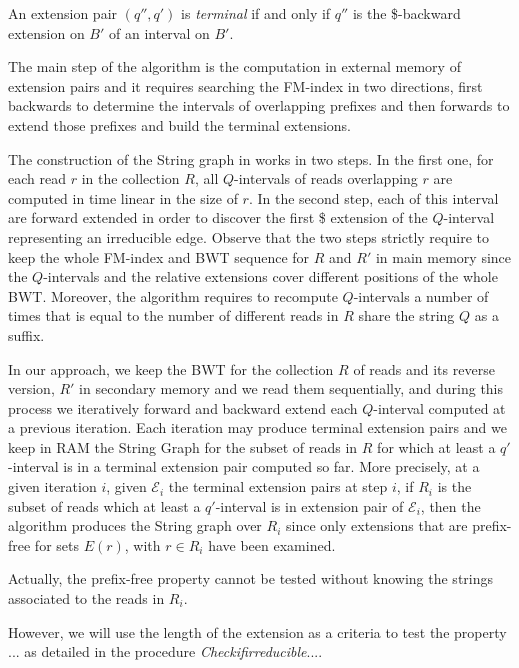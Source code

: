 \documentclass[runningheads,envcountsame,a4paper]{llncs}
\newcommand{\notaestesa}[2]{%
  {\sffamily {\bfseries #1}{\footnotesize #2}}%
  \marginpar{\framebox{\Large *}}%
}
\begin{document}
An extension pair $(q'', q')$ is \emph{terminal} if and only if $q''$ is the \$-backward extension on $B'$ of an interval on $B'$.
\notaestesa{Paola}{rivedere anche in termini informali}


The main step of the algorithm is the computation in external memory of extension pairs and it requires   searching the FM-index in two directions, first backwards to determine the intervals of overlapping prefixes and then forwards to extend those prefixes and build the terminal extensions.

The construction of the String graph in \cite{Simpson10} works in two steps. In the first one,  for each read $r$ in the collection $R$, all $Q$-intervals of reads overlapping  $r$ are computed
in time linear in the size of  $r$.  In the second step, each of this interval are forward extended in order to discover the first \$ extension of the $Q$-interval representing an irreducible edge.
Observe that the two steps strictly require to keep the  whole FM-index and BWT sequence for $R$ and $R'$  in main memory since the $Q$-intervals and the relative extensions cover different positions of  the whole BWT. Moreover, the algorithm requires to recompute   $Q$-intervals  a number of times that is equal to the number of  different reads in $R$ share the string  $Q$
as a suffix.


In our approach, we keep the BWT for the collection $R$ of reads and its reverse version, $R'$ in secondary memory and we read them sequentially, and during this process we iteratively forward and backward extend each $Q$-interval computed at a previous iteration.
Each iteration may produce terminal extension pairs and we keep in RAM the String Graph for the subset of reads in  $R$ for which at least a $q'$-interval is in a terminal extension pair computed so far.  More precisely, at a given iteration $i$, given $\mathcal{E}_i$  the terminal extension pairs at step $i$, if $R_i$ is the subset of reads which at least a $q'$-interval is in  extension pair of
$\mathcal{E}_i$, then the algorithm produces the String graph over $R_i$ since only extensions that are prefix-free for sets $E(r)$, with $r \in R_i$ have been examined.

Actually, the prefix-free property cannot be tested without knowing the strings associated to the reads in $R_i$.

 However,  we will use the length of the extension as a criteria to test the property ... as detailed  in the procedure \emph{Checkifirreducible}....
\end{document}
